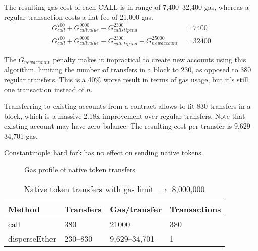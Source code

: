 \documentclass[12pt]{article}
\begin{document}
The resulting gas cost of each CALL\cite{subtleties} is in range of 7,400--32,400 gas, whereas a regular transaction costs a flat fee of 21,000 gas.
%
\begin{align}
G_{call}^{700} + G_{callvalue}^{9000} - G_{callstipend}^{2300} &= 7400 \\
G_{call}^{700} + G_{callvalue}^{9000} - G_{callstipend}^{2300} + G_{newaccount}^{25000} &= 32400
\end{align}

The $G_{newaccount}$ penalty makes it impractical to create new accounts using this algorithm, limiting the number of transfers in a block to 230, as opposed to 380 regular transfers.
This is a 40\% worse result in terms of gas usage, but it's still one transaction instead of $n$.

Transferring to existing accounts from a contract allows to fit 830 transfers in a block, which is a massive 2.18x improvement over regular transfers.
Note that existing account may have zero balance.
The resulting cost per transfer is 9,629--34,701 gas.

Constantinople hard fork has no effect on sending native tokens.

\begin{figure}[h!]
\caption{Gas profile of native token transfers}
\end{figure}


\begin{table}[]
\caption{Native token transfers with gas limit $\rightarrow$ 8,000,000}
\label{table-native}
\begin{center}
\begin{tabular}{@{}llll@{}}
Method        & Transfers & Gas/transfer  & Transactions \\ \midrule
call          & 380       & 21000         & 380          \\
disperseEther & 230--830  & 9,629--34,701 & 1           
\end{tabular}
\end{center}
\end{table}
\end{document}
